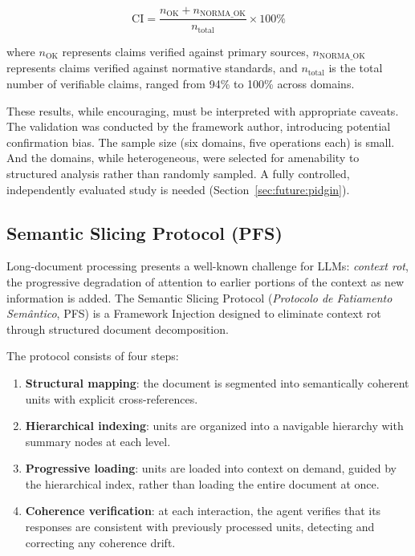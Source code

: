 \documentclass[12pt,a4paper]{article}
\begin{document}
\begin{equation}
\text{CI} = \frac{n_{\text{OK}} + n_{\text{NORMA\_OK}}}{n_{\text{total}}} \times 100\%
\end{equation}

\noindent where $n_{\text{OK}}$ represents claims verified against primary sources, $n_{\text{NORMA\_OK}}$ represents claims verified against normative standards, and $n_{\text{total}}$ is the total number of verifiable claims, ranged from 94\% to 100\% across domains.

These results, while encouraging, must be interpreted with appropriate caveats. The validation was conducted by the framework author, introducing potential confirmation bias. The sample size (six domains, five operations each) is small. And the domains, while heterogeneous, were selected for amenability to structured analysis rather than randomly sampled. A fully controlled, independently evaluated study is needed (Section~\ref{sec:future:pidgin}).

\subsection{Semantic Slicing Protocol (PFS)}
\label{sec:empirical:pfs}

Long-document processing presents a well-known challenge for LLMs: \emph{context rot}, the progressive degradation of attention to earlier portions of the context as new information is added. The Semantic Slicing Protocol (\emph{Protocolo de Fatiamento Sem\^{a}ntico}, PFS) is a Framework Injection designed to eliminate context rot through structured document decomposition.

The protocol consists of four steps:

\begin{enumerate}
    \item \textbf{Structural mapping}: the document is segmented into semantically coherent units with explicit cross-references.
    \item \textbf{Hierarchical indexing}: units are organized into a navigable hierarchy with summary nodes at each level.
    \item \textbf{Progressive loading}: units are loaded into context on demand, guided by the hierarchical index, rather than loading the entire document at once.
    \item \textbf{Coherence verification}: at each interaction, the agent verifies that its responses are consistent with previously processed units, detecting and correcting any coherence drift.
\end{enumerate}
\end{document}
